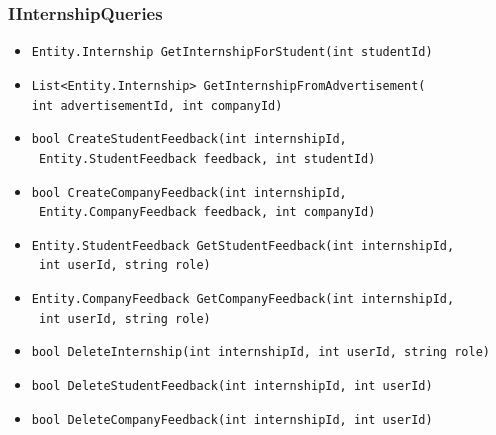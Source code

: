 \subsubsection{IInternshipQueries}
\begin{itemize}
    \item \verb|Entity.Internship GetInternshipForStudent(int studentId)|
    \item \verb|List<Entity.Internship> GetInternshipFromAdvertisement(| \\ \makebox[10em][l]{} \verb|int advertisementId, int companyId)|
    \item \verb|bool CreateStudentFeedback(int internshipId,| \\ \makebox[10em][l]{} \verb| Entity.StudentFeedback feedback, int studentId)|
    \item \verb|bool CreateCompanyFeedback(int internshipId,| \\ \makebox[10em][l]{} \verb| Entity.CompanyFeedback feedback, int companyId)|
    \item \verb|Entity.StudentFeedback GetStudentFeedback(int internshipId,| \\ \makebox[10em][l]{} \verb| int userId, string role)|
    \item \verb|Entity.CompanyFeedback GetCompanyFeedback(int internshipId,| \\ \makebox[10em][l]{} \verb| int userId, string role)|
    \item \verb|bool DeleteInternship(int internshipId, int userId, string role)|
    \item \verb|bool DeleteStudentFeedback(int internshipId, int userId)|
    \item \verb|bool DeleteCompanyFeedback(int internshipId, int userId)|
\end{itemize}

